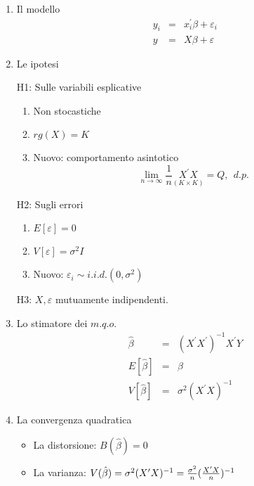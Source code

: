 \documentclass[a4paper]{report}
\theoremstyle{remark}
\begin{document}
\begin{enumerate}
\item {Il modello} 
\begin{eqnarray*}
y_{i} &=&x_{i}^{\prime }\beta +\varepsilon _{i} \\
y &=&X\beta +\varepsilon
\end{eqnarray*}

\item {Le ipotesi}

H1: Sulle variabili esplicative

\begin{enumerate}
\item Non stocastiche

\item $rg(X)=K$

\item Nuovo: comportamento asintotico 
\begin{equation*}
\lim_{n\rightarrow \infty }\frac{1}{n}\underset{(K\times K)}{X^{\prime }X}%
=Q,\ \ d.p.
\end{equation*}
\end{enumerate}

H2: Sugli errori

\begin{enumerate}
\item $E[\varepsilon ]=0$

\item $V[\varepsilon ]=\sigma ^{2}I$

\item Nuovo: $\varepsilon _{i}\sim i.i.d.(0,\sigma ^{2})$
\end{enumerate}

H3: $X,\varepsilon $ mutuamente indipendenti.

\item {Lo stimatore dei }${m.q.o.}$%
\begin{eqnarray*}
\hat{\beta} &=&(X^{\prime }X^{\prime })^{-1}X^{\prime }Y \\
E[\hat{\beta}] &=&\beta \\
V[\hat{\beta}] &=&\sigma ^{2}(X^{\prime }X)^{-1}
\end{eqnarray*}

\item {La convergenza quadratica}

\begin{itemize}
\item La distorsione: $B(\hat{\beta})=0$

\item La varianza: $V(\hat{\beta})=\sigma ^{2}(X^{\prime }X)^{-1}=\frac{%
\sigma ^{2}}{n}(\frac{X^{\prime }X}{n})^{-1}$


\end{itemize}
\end{enumerate}
\end{document}
